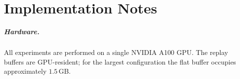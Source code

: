 


\chapter{Implementation Notes}
\label{app:impl}

\paragraph{Hardware.} All experiments are performed on a single NVIDIA
A100 GPU. The replay buffers are GPU-resident; for the largest
configuration the flat buffer occupies approximately $1.5\,$GB.

